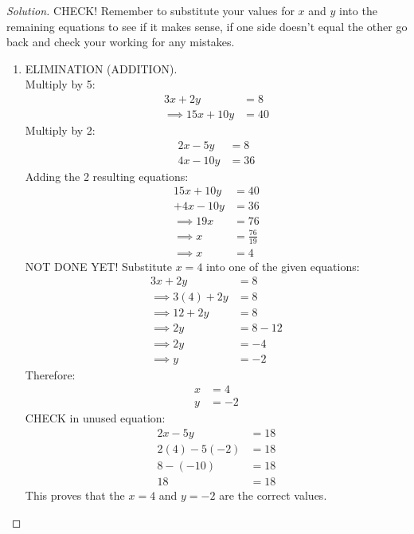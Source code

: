 \documentclass[12pt]{article}
\newenvironment{solution}{\begin{proof}[Solution]}{\end{proof}}
\begin{document}
\begin{solution}
CHECK! Remember to substitute your values for $x$ and $y$ into the remaining equations to see if it makes sense, if one side doesn't equal the other go back and check your working for any mistakes.
\clearpage

\begin{enumerate}
    \item ELIMINATION (ADDITION). \\
    Multiply by 5:
    \begin{align*}
        3x + 2y &= 8  \\
        \implies 15x + 10y &= 40
    \end{align*}
    Multiply by 2:
    \begin{align*}
        2x - 5y &= 8 \\
        4x - 10y &= 36
    \end{align*}
    Adding the 2 resulting equations:
    \begin{align*}
        15x + 10y &= 40 \\
        + 4x - 10y &= 36 \\
        \implies 19x &= 76 \\
        \implies x &= \frac{76}{19} \\
        \implies x &= 4
    \end{align*}
    NOT DONE YET! Substitute $x=4$ into one of the given equations:
    \begin{align*}
        3x + 2y &= 8 \\
        \implies 3(4) + 2y &= 8 \\
        \implies 12 +2y &= 8 \\
        \implies 2y &= 8 - 12 \\
        \implies 2y &= -4 \\
        \implies y &= -2
    \end{align*}
    Therefore:
    \begin{align*}
        x &= 4 \\
        y &= -2
    \end{align*}
    CHECK in unused equation:
    \begin{align*}
        2x - 5y &= 18 \\
        2(4) - 5(-2) &= 18 \\
        8 - (-10) &= 18 \\
        18 &= 18
    \end{align*}
    This proves that the $x=4$ and $y = -2$ are the correct values.
\clearpage


\end{enumerate}
\end{solution}
\end{document}
